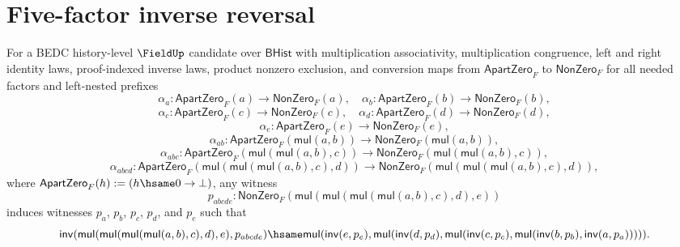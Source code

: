 \section{Five-factor inverse reversal}
\label{sec:field-inverse-five-factor-reversal}

\begin{theorem}
\label{thm:field-inverse-five-factor-product-reversal-from-apartness}
For a BEDC history-level $\FieldUp$ candidate over $\mathsf{BHist}$ with
multiplication associativity, multiplication congruence, left and right
identity laws, proof-indexed inverse laws, product nonzero exclusion, and
conversion maps from $\mathsf{ApartZero}_F$ to $\mathsf{NonZero}_F$ for all
needed factors and left-nested prefixes
$$
\alpha_a:\mathsf{ApartZero}_F(a)\to\mathsf{NonZero}_F(a),\quad
\alpha_b:\mathsf{ApartZero}_F(b)\to\mathsf{NonZero}_F(b),
$$
$$
\alpha_c:\mathsf{ApartZero}_F(c)\to\mathsf{NonZero}_F(c),\quad
\alpha_d:\mathsf{ApartZero}_F(d)\to\mathsf{NonZero}_F(d),
$$
$$
\alpha_e:\mathsf{ApartZero}_F(e)\to\mathsf{NonZero}_F(e),
$$
$$
\alpha_{ab}:\mathsf{ApartZero}_F(\mathsf{mul}(a,b))\to
\mathsf{NonZero}_F(\mathsf{mul}(a,b)),
$$
$$
\alpha_{abc}:\mathsf{ApartZero}_F(\mathsf{mul}(\mathsf{mul}(a,b),c))\to
\mathsf{NonZero}_F(\mathsf{mul}(\mathsf{mul}(a,b),c)),
$$
$$
\alpha_{abcd}:
\mathsf{ApartZero}_F(\mathsf{mul}(\mathsf{mul}(\mathsf{mul}(a,b),c),d))\to
\mathsf{NonZero}_F(\mathsf{mul}(\mathsf{mul}(\mathsf{mul}(a,b),c),d)),
$$
where $\mathsf{ApartZero}_F(h):=(h\hsame0\to\bot)$, any witness
$$
p_{abcde}:
\mathsf{NonZero}_F(
\mathsf{mul}(\mathsf{mul}(\mathsf{mul}(\mathsf{mul}(a,b),c),d),e))
$$
induces witnesses $p_a$, $p_b$, $p_c$, $p_d$, and $p_e$ such that
$$
\mathsf{inv}(
\mathsf{mul}(\mathsf{mul}(\mathsf{mul}(\mathsf{mul}(a,b),c),d),e),
p_{abcde})
\hsame
\mathsf{mul}(\mathsf{inv}(e,p_e),
\mathsf{mul}(\mathsf{inv}(d,p_d),
\mathsf{mul}(\mathsf{inv}(c,p_c),
\mathsf{mul}(\mathsf{inv}(b,p_b),\mathsf{inv}(a,p_a))))).
$$
\end{theorem}
